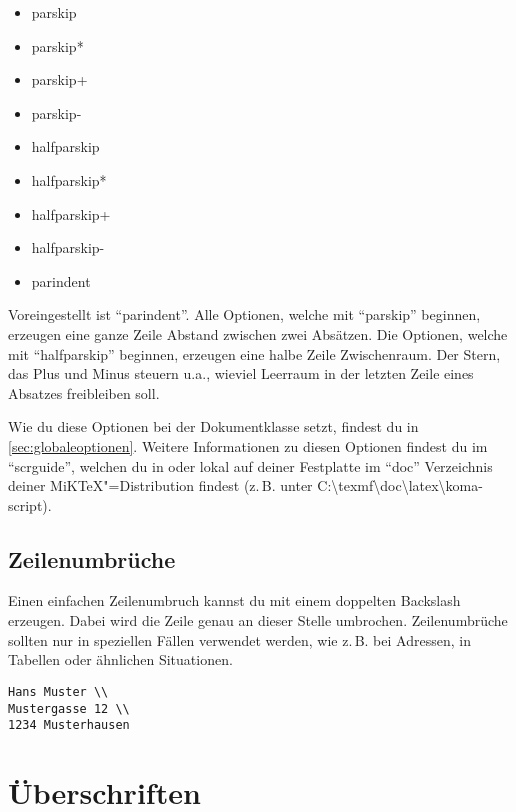 \begin{itemize}
	\item parskip
	\item parskip*
	\item parskip+
	\item parskip-
	\item halfparskip
	\item halfparskip*
	\item halfparskip+
	\item halfparskip-
	\item parindent
\end{itemize}

Voreingestellt ist \enquote{parindent}. Alle Optionen, welche mit \enquote{parskip} beginnen, erzeugen eine ganze Zeile Abstand zwischen zwei Absätzen. Die Optionen, welche mit \enquote{halfparskip} beginnen, erzeugen eine halbe Zeile Zwischenraum. Der Stern, das Plus und Minus steuern u.a., wieviel Leerraum in der letzten Zeile eines Absatzes freibleiben soll.

Wie du diese Optionen bei der Dokumentklasse setzt, findest du in \cref{sec:globaleoptionen}. Weitere Informationen zu diesen Optionen findest du im \enquote{scrguide}, welchen du in \cite{KOMA} oder lokal auf deiner Festplatte im \enquote{doc} Verzeichnis deiner MiKTeX"=Distribution findest (z.\,B. unter C:\textbackslash texmf\textbackslash doc\textbackslash latex\textbackslash koma-script).

\subsection{Zeilenumbrüche}

Einen einfachen Zeilenumbruch kannst du mit einem doppelten Backslash erzeugen. Dabei wird die Zeile genau an dieser Stelle umbrochen. Zeilenumbrüche sollten nur in speziellen Fällen verwendet werden, wie z.\,B. bei Adressen, in Tabellen oder ähnlichen Situationen.
\begin{lstlisting}
Hans Muster \\
Mustergasse 12 \\
1234 Musterhausen
\end{lstlisting}

\section{Überschriften}

